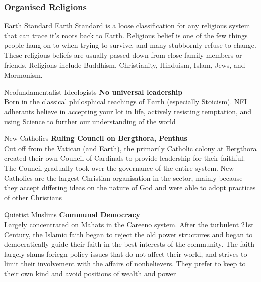 \begin{multicols}{2}

\subsubsection{Organised Religions}

\begin{genericsection}{Earth Standard}
Earth Standard is a loose classification for any religious system that can trace it's roots back to Earth. Religious belief is one of the few things people hang on to when trying to survive, and many stubbornly refuse to change. These religious beliefs are usually passed down from close family members or friends. Religions include Buddhism, Christianity, Hinduism, Islam, Jews, and Mormonism.
\end{genericsection}

\begin{genericsection}{Neofundamentalist Ideologists}
\textbf{No universal leadership}\\
Born in the classical philosphical teachings of Earth (especially Stoicism). NFI adherants believe in accepting your lot in life, actively resisting temptation, and using Science to further our understanding of the world
\end{genericsection}

\begin{genericsection}{New Catholics}
\textbf{Ruling Council on Bergthora, Penthus}\\
Cut off from the Vatican (and Earth), the primarily Catholic colony at Bergthora created their own Council of Cardinals to provide leadership for their faithful. The Council gradually took over the governance of the entire system. New Catholics are the largest Christian organisation in the sector, mainly because they accept differing ideas on the nature of God and were able to adopt practices of other Christians
\end{genericsection}

\begin{genericsection}{Quietist Muslims}
\textbf{Communal Democracy}\\
Largely concentrated on Mahats in the Careeno system. After the turbulent 21st Century, the Islamic faith began to reject the old power structures and began to democratically guide their faith in the best interests of the community. The faith largely shuns foriegn policy issues that do not affect their world, and strives to limit their involvement with the affairs of nonbelievers. They prefer to keep to their own kind and avoid positions of wealth and power
\end{genericsection}


\end{multicols}
